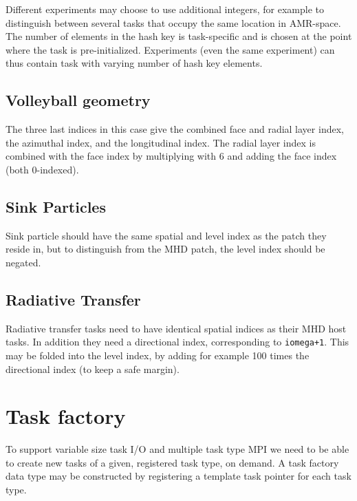 \documentclass[paper=a4,fontsize=11pt]{scrartcl}
\numberwithin{equation}{section}		%
\numberwithin{figure}{section}			%
\numberwithin{table}{section}				%
\begin{document}
Different experiments may choose to use additional integers, for example to distinguish between several tasks that occupy the same location in AMR-space.  The number of elements in the hash key is task-specific and is chosen at the point where the task is pre-initialized.  Experiments (even the same experiment) can thus contain task with varying number of hash key elements.  

\subsection{Volleyball geometry}
The three last indices in this case give the combined face and radial layer index, the azimuthal index, and the longitudinal index.  The radial layer index is combined with the face index by multiplying with 6 and adding the face index (both 0-indexed).

\subsection{Sink Particles}
Sink particle should have the same spatial and level index as the patch they reside in, but to distinguish from the MHD patch, the level index should be negated.

\subsection{Radiative Transfer}
Radiative transfer tasks need to have identical spatial indices as their MHD host tasks.  In addition they need a directional index, corresponding to \verb:iomega+1:.  This may be folded into the level index, by adding for example 100 times the directional index (to keep a safe margin).

\section{Task factory}
To support variable size task I/O and multiple task type MPI we need to be able to create new tasks of a given, registered task type, on demand.  A task factory data type may be constructed by registering a template task pointer for each task type.
\end{document}
